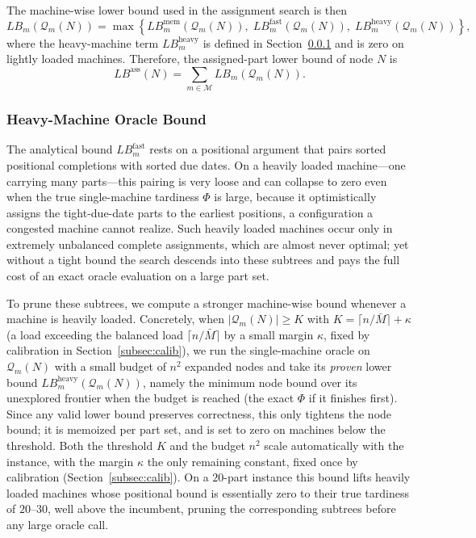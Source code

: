 \documentclass[review,3p,times,authoryear]{elsarticle}
\begin{document}
The machine-wise lower bound used in the assignment search is then
\[
LB_m(\mathcal{Q}_m(N))
=
\max
\left\{
LB_m^{\mathrm{mem}}(\mathcal{Q}_m(N)),
\;
LB_m^{\mathrm{fast}}(\mathcal{Q}_m(N)),
\;
LB_m^{\mathrm{heavy}}(\mathcal{Q}_m(N))
\right\},
\]
where the heavy-machine term $LB_m^{\mathrm{heavy}}$ is defined in
Section~\ref{subsubsec:heavy} and is zero on lightly loaded machines.
Therefore, the assigned-part lower bound of node $N$ is
\[
LB^{\mathrm{ass}}(N)
=
\sum_{m\in\mathcal{M}}
LB_m(\mathcal{Q}_m(N)).
\]

\subsubsection{Heavy-Machine Oracle Bound}
\label{subsubsec:heavy}

The analytical bound $LB_m^{\mathrm{fast}}$ rests on a positional argument that
pairs sorted positional completions with sorted due dates. On a heavily loaded
machine---one carrying many parts---this pairing is very loose and can collapse
to zero even when the true single-machine tardiness $\Phi$ is large, because it
optimistically assigns the tight-due-date parts to the earliest positions, a
configuration a congested machine cannot realize. Such heavily loaded machines
occur only in extremely unbalanced complete assignments, which are almost never
optimal; yet without a tight bound the search descends into these subtrees and
pays the full cost of an exact oracle evaluation on a large part set.

To prune these subtrees, we compute a stronger machine-wise bound whenever a
machine is heavily loaded. Concretely, when
$|\mathcal{Q}_m(N)|\ge K$ with $K=\lceil n/\bar M\rceil+\kappa$ (a load exceeding the
balanced load $\lceil n/\bar M\rceil$ by a small margin $\kappa$, fixed by calibration in Section~\ref{subsec:calib}), we run the
single-machine oracle on $\mathcal{Q}_m(N)$ with a small budget of $n^2$
expanded nodes and take its \emph{proven} lower bound
$LB_m^{\mathrm{heavy}}(\mathcal{Q}_m(N))$, namely the minimum node bound over its
unexplored frontier when the budget is reached (the exact $\Phi$ if it finishes
first). Since any valid lower bound preserves correctness, this only tightens the
node bound; it is memoized per part set, and is set to zero on machines below the
threshold. Both the threshold $K$ and the budget $n^2$ scale automatically with
the instance, with the margin $\kappa$ the only remaining constant, fixed once by calibration (Section~\ref{subsec:calib}). On a $20$-part instance this bound
lifts heavily loaded machines whose positional bound is essentially zero to their
true tardiness of $20$--$30$, well above the incumbent, pruning the
corresponding subtrees before any large oracle call.
\end{document}
